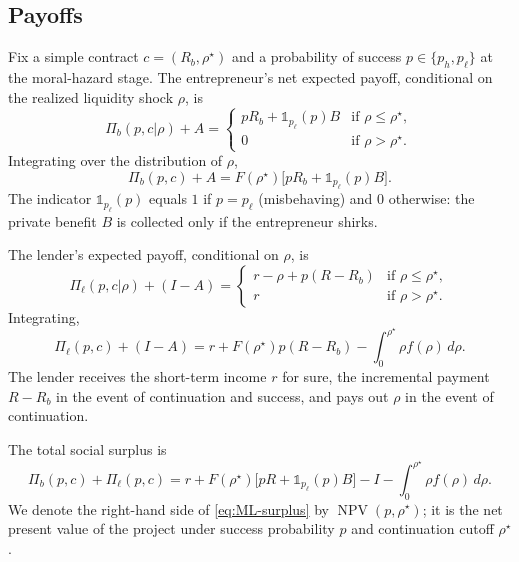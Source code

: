 \documentclass[11pt,a4paper,oneside]{book}
\def\leq{\leqslant}
\DeclareMathOperator{\NPV}{NPV}
\theoremstyle{plain}
\theoremstyle{definition}
\theoremstyle{remark}
\numberwithin{equation}{chapter}
\begin{document}
\subsection{Payoffs}

Fix a simple contract $c = (R_b, \rho^\star)$ and a probability of success $p \in \{p_h, p_\ell\}$ at the moral-hazard stage.
The entrepreneur's net expected payoff, conditional on the realized liquidity shock $\rho$, is
\begin{equation}\label{eq:ML-Pi-b-cond}
  \Pi_b(p, c \vert \rho) + A = \begin{cases}
    p R_b + \mathbb{1}_{p_\ell}(p) B & \text{if } \rho \leq \rho^\star, \\
    0 & \text{if } \rho > \rho^\star.
  \end{cases}
\end{equation}
Integrating over the distribution of $\rho$,
\begin{equation}\label{eq:ML-Pi-b}
  \Pi_b(p, c) + A = F(\rho^\star) \bigl[ p R_b + \mathbb{1}_{p_\ell}(p) B \bigr].
\end{equation}
The indicator $\mathbb{1}_{p_\ell}(p)$ equals $1$ if $p = p_\ell$ (misbehaving) and $0$ otherwise: the private benefit $B$ is collected only if the entrepreneur shirks.

The lender's expected payoff, conditional on $\rho$, is
\begin{equation}\label{eq:ML-Pi-ell-cond}
  \Pi_\ell(p, c \vert \rho) + (I - A) = \begin{cases}
    r - \rho + p(R - R_b) & \text{if } \rho \leq \rho^\star, \\
    r & \text{if } \rho > \rho^\star.
  \end{cases}
\end{equation}
Integrating,
\begin{equation}\label{eq:ML-Pi-ell}
  \Pi_\ell(p, c) + (I - A) = r + F(\rho^\star) p (R - R_b) - \int_0^{\rho^\star} \rho f(\rho) \, d\rho.
\end{equation}
The lender receives the short-term income $r$ for sure, the incremental payment $R - R_b$ in the event of continuation and success, and pays out $\rho$ in the event of continuation.

The total social surplus is
\begin{equation}\label{eq:ML-surplus}
  \Pi_b(p, c) + \Pi_\ell(p, c) = r + F(\rho^\star) \bigl[ p R + \mathbb{1}_{p_\ell}(p) B \bigr] - I - \int_0^{\rho^\star} \rho f(\rho) \, d\rho.
\end{equation}
We denote the right-hand side of \eqref{eq:ML-surplus} by $\NPV(p, \rho^\star)$; it is the net present value of the project under success probability $p$ and continuation cutoff $\rho^\star$.
\end{document}
